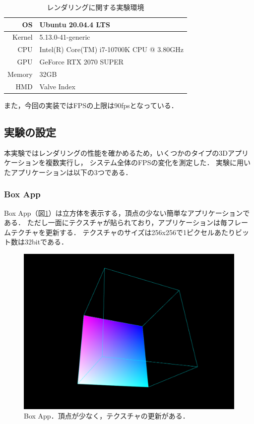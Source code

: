 \begin{table}[htbp]
  \centering
  \begin{tabular}{|r||l|}
    \hline
    OS     & Ubuntu 20.04.4 LTS                        \\
    \hline
    Kernel & 5.13.0-41-generic                         \\
    \hline
    CPU    & Intel(R) Core(TM) i7-10700K CPU @ 3.80GHz \\
    \hline
    GPU    & GeForce RTX 2070 SUPER                    \\
    \hline
    Memory & 32GB                                      \\
    \hline
    HMD    & Valve Index                               \\
    \hline
  \end{tabular}
  \caption{レンダリングに関する実験環境}
  \label{table:rendering-env}
\end{table}

また，今回の実装ではFPSの上限は90fpsとなっている．

\subsection{実験の設定}

本実験ではレンダリングの性能を確かめるため，いくつかのタイプの3Dアプリケーションを複数実行し，
システム全体のFPSの変化を測定した．
実験に用いたアプリケーションは以下の3つである．

\subsubsection*{Box App}

Box App（図\ref{fig:box-app}）は立方体を表示する，頂点の少ない簡単なアプリケーションである．
ただし一面にテクスチャが貼られており，アプリケーションは毎フレームテクチャを更新する．
テクスチャのサイズは256x256で1ピクセルあたりビット数は32bitである．

\begin{figure}[htbp]
  \centering
  \includegraphics[keepaspectratio, width=0.6\linewidth]{figures/box-app.png}
  \caption{
    Box App．頂点が少なく，テクスチャの更新がある．
  }
  \label{fig:box-app}
\end{figure}

